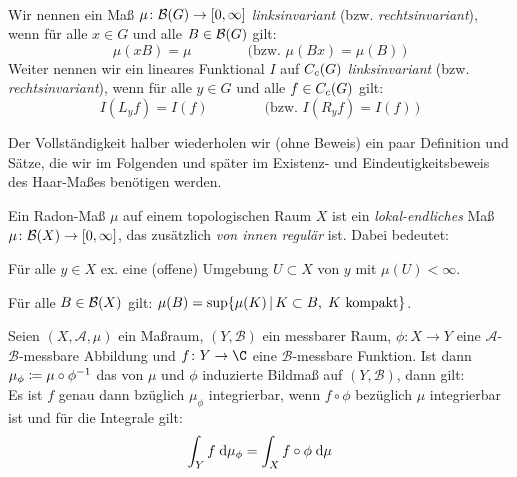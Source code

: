 \begin{thDef}\hfill\\
    Wir nennen ein Maß $\mu\colon \mathcal{B}(G) \to [0,\infty]$
    \emph{linksinvariant} (bzw. \emph{rechtsinvariant}), 
    wenn für alle $x\in G$ und alle $B\in\mathcal{B}(G)$ gilt:
    \[  \mu(xB) = \mu  
        \qquad\qquad\bigl(\text{bzw. } 
        \mu(Bx) = \mu(B) 
        \,\bigr)
    \]
    Weiter nennen wir ein lineares Funktional $I$ auf $C_c(G)$ 
    \emph{linksinvariant} (bzw. \emph{rechtsinvariant}),
    wenn für alle $y\in G$ und alle $f\in C_c(G)$ gilt:
    \[  I(L_yf) = I(f) 
        \qquad\qquad\bigl(\text{bzw. } 
        I(R_yf) = I(f)
        \,\bigr)
    \]
\end{thDef}

\medskip
Der Vollständigkeit halber wiederholen wir (ohne Beweis) 
ein paar Definition und Sätze, die wir im Folgenden und später im Existenz- und
Eindeutigkeitsbeweis des Haar-Maßes  %
benötigen werden.

\begin{thDef}
    \label{tg:def:radonmeasure}
    Ein Radon-Maß $\mu$ auf einem topologischen Raum $X$ ist ein
    \emph{lokal-endliches} Maß $\mu\colon\mathcal{B}(X)\to[0,\infty]$, das
    zusätzlich \emph{von innen regulär} ist.
    Dabei bedeutet:
    \begin{description}[align=left, 
                        itemindent=15pt, 
                        leftmargin=0pt, 
                        itemsep=0pt,
                        topsep=0.3\baselineskip]
        \item[lokal-endlich:]
            Für alle $y\in X$ ex. eine (offene) Umgebung $U\subset X$ von
            $y$ mit $\mu(U) < \infty$.
        \item[von innen regulär:]
            Für alle $B\in\mathcal{B}(X)$ gilt:
            $\mu(B) = \sup\{ \mu(K) \Mid K\subset B,\; K\text{ kompakt} \}$.
    \end{description}
\end{thDef}

\begin{thSatz}
    \label{tg:trafo}
    Seien $(X,\mathcal{A},\mu)$ ein Maßraum, $(Y,\mathcal{B})$ ein
    messbarer Raum, $\phi\colon X\to Y$ eine $\mathcal{A}$-$\mathcal{B}$-messbare
    Abbildung und $f\colon Y\to\C$ eine $\mathcal{B}$-messbare Funktion.
    Ist dann $\mu_\phi \coloneqq \mu \circ \phi^{-1}$ das von $\mu$ und $\phi$
    induzierte Bildmaß auf $(Y,\mathcal{B})$, dann gilt:
    \\
    Es ist $f$ genau dann bzüglich $\mu_\phi$ integrierbar, wenn $f\circ\phi$
    bezüglich $\mu$ integrierbar ist und für die Integrale gilt:
    \[ \int_Y f \;\mathrm{d} \mu_\phi = \int_X f\circ\phi \;\mathrm{d} \mu \]
\end{thSatz}

